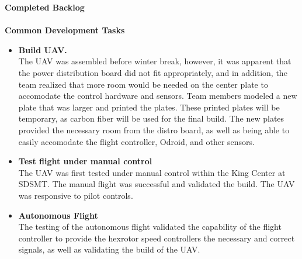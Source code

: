 \vspace{5mm}
\noindent\Large{\textbf{Completed Backlog}}\\
\vspace{2mm}\\
\large{\textbf{Common Development Tasks}}
\normalsize
\begin{itemize}
\item \textbf{Build UAV.}\\
The UAV was assembled before winter break, however, it was apparent that the power distribution board did not fit appropriately, and in addition, the team realized that more room would be needed on the center plate to accomodate the control hardware and sensors. Team members modeled a new plate that was larger and printed the plates. These printed plates will be temporary, as carbon fiber will be used for the final build. The new plates provided the necessary room from the distro board, as well as being able to easily accomodate the flight controller, Odroid, and other sensors.\\
\item \textbf{Test flight under manual control} \\
The UAV was first tested under manual control within the King Center at SDSMT. The manual flight was successful and validated the build. The UAV was responsive to pilot controls.
\item \textbf{Autonomous Flight} \\
The testing of the autonomous flight validated the capability of the flight controller to provide the hexrotor speed controllers the necessary and correct signals, as well as validating the build of the UAV.


\end{itemize}

